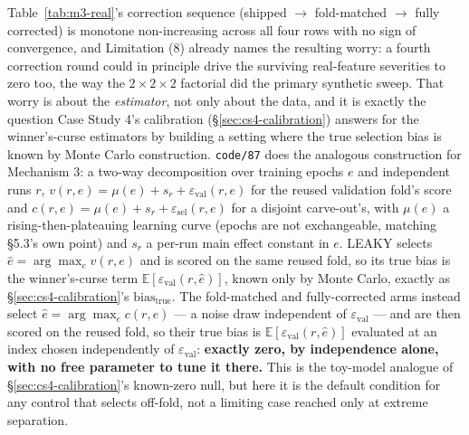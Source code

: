 \documentclass[10pt]{article} %
\begin{document}
Table~\ref{tab:m3-real}'s correction sequence (shipped $\to$ fold-matched $\to$
fully corrected) is monotone non-increasing across all four rows with no sign
of convergence, and Limitation (8) already names the resulting worry: a fourth
correction round could in principle drive the surviving real-feature
severities to zero too, the way the $2\times2\times2$ factorial did the primary
synthetic sweep. That worry is about the \emph{estimator}, not only about the
data, and it is exactly the question Case Study 4's calibration
(\S\ref{sec:cs4-calibration}) answers for the winner's-curse estimators by
building a setting where the true selection bias is known by Monte Carlo
construction. \texttt{code/87} does the analogous construction for Mechanism
3: a two-way decomposition over training epochs $e$ and independent runs $r$,
$v(r,e)=\mu(e)+s_r+\varepsilon_{\text{val}}(r,e)$ for the reused validation
fold's score and $c(r,e)=\mu(e)+s_r+\varepsilon_{\text{sel}}(r,e)$ for a
disjoint carve-out's, with $\mu(e)$ a rising-then-plateauing learning curve
(epochs are not exchangeable, matching \S5.3's own point) and $s_r$ a per-run
main effect constant in $e$. LEAKY selects
$\hat e=\arg\max_e v(r,e)$ and is scored on the same reused fold, so its true
bias is the winner's-curse term $\mathbb{E}[\varepsilon_{\text{val}}(r,\hat
e)]$, known only by Monte Carlo, exactly as \S\ref{sec:cs4-calibration}'s
$\text{bias}_{\text{true}}$. The fold-matched and fully-corrected arms instead
select $\hat e=\arg\max_e c(r,e)$ --- a noise draw independent of
$\varepsilon_{\text{val}}$ --- and are then scored on the reused fold, so
their true bias is $\mathbb{E}[\varepsilon_{\text{val}}(r,\hat e)]$ evaluated
at an index chosen independently of $\varepsilon_{\text{val}}$: \textbf{exactly
zero, by independence alone, with no free parameter to tune it there.} This is
the toy-model analogue of \S\ref{sec:cs4-calibration}'s known-zero null, but
here it is the default condition for any control that selects off-fold, not a
limiting case reached only at extreme separation.
\end{document}
